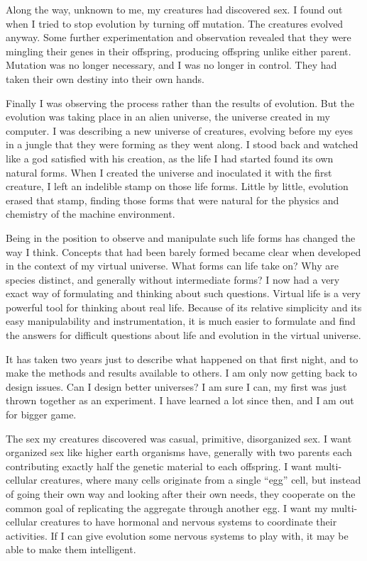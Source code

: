 Along the way, unknown to me, my creatures had discovered sex.  I found out
when I tried to stop evolution by turning off mutation.  The creatures
evolved anyway.  Some further experimentation and observation revealed that
they were mingling their genes in their offspring, producing offspring unlike
either parent.  Mutation was no longer necessary, and I was no longer in
control.  They had taken their own destiny into their own hands.

Finally I was observing the process rather than the results of evolution.
But the evolution was taking place in an alien universe, the universe created
in my computer.  I was describing a new universe of creatures, evolving
before my eyes in a jungle that they were forming as they went along.  I
stood back and watched like a god satisfied with his creation, as the life I
had started found its own natural forms.  When I created the universe and
inoculated it with the first creature, I left an indelible stamp on those
life forms.  Little by little, evolution erased that stamp, finding those
forms that were natural for the physics and chemistry of the machine
environment.

Being in the position to observe and manipulate such life forms has changed
the way I think.  Concepts that had been barely formed became clear
when developed in the context of my virtual universe.  What forms can life
take on?  Why are species distinct, and generally without intermediate forms?
I now had a very exact way of formulating and thinking about such questions.
Virtual life is a very powerful tool for thinking about real life.  Because
of its relative simplicity and its easy manipulability and instrumentation, it
is much easier to formulate and find the answers for difficult questions about
life and evolution in the virtual universe.

It has taken two years just to describe what happened on that first night,
and to make the methods and results available to others.  I am only now
getting back to design issues.  Can I design better universes?  I am sure
I can, my first was just thrown together as an experiment.  I have learned
a lot since then, and I am out for bigger game.

The sex my creatures discovered was casual, primitive, disorganized sex.
I want organized sex like higher earth organisms have, generally with two
parents each contributing exactly half the genetic material to each offspring.
I want multi-cellular creatures, where many cells originate from a single
``egg'' cell, but instead of going their own way and looking after their own
needs, they cooperate on the common goal of replicating the aggregate through
another egg.  I want my multi-cellular creatures to have hormonal and nervous
systems to coordinate their activities.  If I can give evolution some nervous
systems to play with, it may be able to make them intelligent.

